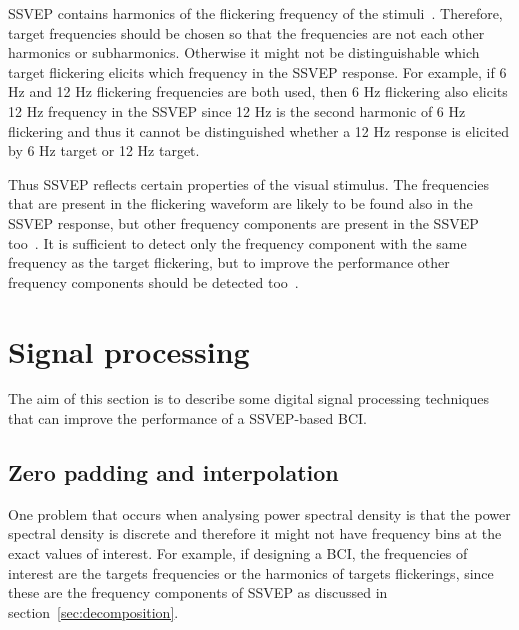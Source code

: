 \gls{SSVEP} contains \glspl{harmonic} of the \gls{flickering} frequency of the stimuli~\cite{ssvep_response}. Therefore, \gls{target} frequencies should be chosen so that the frequencies are not each other \glspl{harmonic} or \glspl{subharmonic}. Otherwise it might not be distinguishable which \gls{target} \gls{flickering} elicits which frequency in the \gls{SSVEP} response. For example, if 6 Hz and 12 Hz \gls{flickering} frequencies are both used, then 6 Hz \gls{flickering} also elicits 12 Hz frequency in the \gls{SSVEP} since 12 Hz is the second harmonic of 6 Hz \gls{flickering} and thus it cannot be distinguished whether a 12 Hz response is elicited by 6 Hz \gls{target} or 12 Hz \gls{target}.

Thus \gls{SSVEP} reflects certain properties of the visual stimulus. The frequencies that are present in the \gls{flickering waveform} are likely to be found also in the \gls{SSVEP} response, but other \glspl{frequency component} are present in the \gls{SSVEP} too~\cite{square_sine}. It is sufficient to detect only the \gls{frequency component} with the same frequency as the \gls{target} \gls{flickering}, but to improve the performance other \glspl{frequency component} should be detected too~\cite{harmonic_imrpovement}.


\section{Signal processing}

The aim of this section is to describe some digital signal processing techniques that can improve the performance of a \gls{SSVEP}-based \gls{BCI}.

\subsection{Zero padding and interpolation}

One problem that occurs when analysing \gls{power spectral density} is that the \gls{power spectral density} is discrete and therefore it might not have frequency bins at the exact values of interest. For example, if designing a \gls{BCI}, the frequencies of interest are the \glspl{target} frequencies or the \glspl{harmonic} of \glspl{target} \glspl{flickering}, since these are the \glspl{frequency component} of \gls{SSVEP} as discussed in section~\ref{sec:decomposition}.

